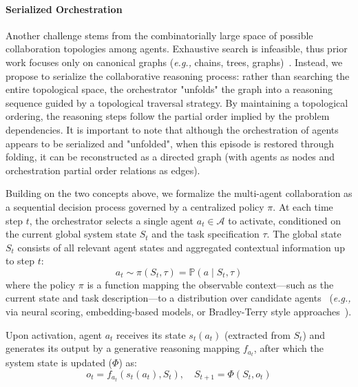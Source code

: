 \documentclass{article}
\newcommand{\eg}{\textit{e.g., }}
\begin{document}
\paragraph{Serialized Orchestration}
Another challenge stems from the combinatorially large space of possible collaboration topologies among agents. Exhaustive search is infeasible, thus prior work focuses only on canonical graphs (\eg chains, trees, graphs)~\cite{yao2023treethoughtsdeliberateproblem,wei2022chain,10.1609/aaai.v38i16.29720}. Instead, we propose to serialize the collaborative reasoning process: rather than searching the entire topological space, the orchestrator "unfolds" the graph into a reasoning sequence guided by a topological traversal strategy. By maintaining a topological ordering, the reasoning steps follow the partial order implied by the problem dependencies. It is important to note that although the orchestration of agents appears to be serialized and "unfolded", when this episode is restored through folding, it can be reconstructed as a directed graph (with agents as nodes and orchestration partial order relations as edges).

Building on the two concepts above, we formalize the multi-agent collaboration as a sequential decision process governed by a centralized policy \(\pi\). At each time step \( t \), the orchestrator selects a single agent \( a_t \in \mathcal{A} \) to activate, conditioned on the current global system state \( S_t \) and the task specification \(\tau\). The global state \( S_t \) consists of all relevant agent states and aggregated contextual information up to step \( t \):
\begin{equation}
a_t \sim \pi(S_t, \tau) = \mathbb{P}(a \mid S_t, \tau)
\end{equation}
where the policy \(\pi\) is a function mapping the observable context—such as the current state and task description—to a distribution over candidate agents~\cite{pmlr-v235-xu24ad,yan2024efficientreinforcementlearninglarge} (\eg via neural scoring, embedding-based models, or Bradley-Terry style approaches~\cite{wang2025helpsteer2preferencecomplementingratingspreferences}).

Upon activation, agent \(a_t\) receives its state \(s_t(a_t)\) (extracted from \(S_t\)) and generates its output by a generative reasoning mapping \(f_{a_t}\), after which the system state is updated ($\Phi$) as:
\begin{equation}
o_t = f_{a_t}(s_t(a_t), S_t), \quad S_{t+1} = \Phi(S_t, o_t)
\end{equation}
\end{document}
